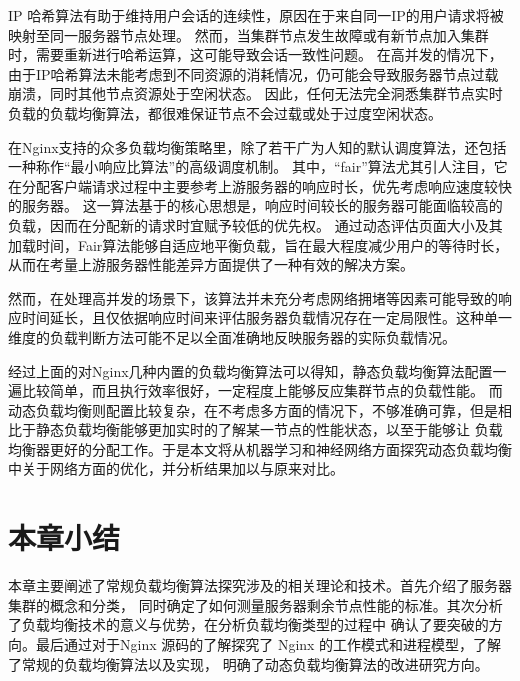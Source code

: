IP 哈希算法有助于维持用户会话的连续性，原因在于来自同一IP的用户请求将被映射至同一服务器节点处理。
然而，当集群节点发生故障或有新节点加入集群时，需要重新进行哈希运算，这可能导致会话一致性问题。
在高并发的情况下，由于IP哈希算法未能考虑到不同资源的消耗情况，仍可能会导致服务器节点过载崩溃，同时其他节点资源处于空闲状态。
因此，任何无法完全洞悉集群节点实时负载的负载均衡算法，都很难保证节点不会过载或处于过度空闲状态。

在Nginx支持的众多负载均衡策略里，除了若干广为人知的默认调度算法，还包括一种称作“最小响应比算法”的高级调度机制。
其中，“fair”算法尤其引人注目，它在分配客户端请求过程中主要参考上游服务器的响应时长，优先考虑响应速度较快的服务器。
这一算法基于的核心思想是，响应时间较长的服务器可能面临较高的负载，因而在分配新的请求时宜赋予较低的优先权。
通过动态评估页面大小及其加载时间，Fair算法能够自适应地平衡负载，旨在最大程度减少用户的等待时长，从而在考量上游服务器性能差异方面提供了一种有效的解决方案。

然而，在处理高并发的场景下，该算法并未充分考虑网络拥堵等因素可能导致的响应时间延长，且仅依据响应时间来评估服务器负载情况存在一定局限性。这种单一维度的负载判断方法可能不足以全面准确地反映服务器的实际负载情况\cite{张艳肖2023基于Fair函数神经网络的厚度传感器输出特性分析}。

经过上面的对Nginx几种内置的负载均衡算法可以得知，静态负载均衡算法配置一遍比较简单，而且执行效率很好，一定程度上能够反应集群节点的负载性能。
而动态负载均衡则配置比较复杂，在不考虑多方面的情况下，不够准确可靠，但是相比于静态负载均衡能够更加实时的了解某一节点的性能状态，以至于能够让
负载均衡器更好的分配工作。于是本文将从机器学习和神经网络方面探究动态负载均衡中关于网络方面的优化，并分析结果加以与原来对比。

\section{本章小结}

本章主要阐述了常规负载均衡算法探究涉及的相关理论和技术。首先介绍了服务器集群的概念和分类，
同时确定了如何测量服务器剩余节点性能的标准。其次分析了负载均衡技术的意义与优势，在分析负载均衡类型的过程中
确认了要突破的方向。最后通过对于Nginx 源码的了解探究了 Nginx 的工作模式和进程模型，了解了常规的负载均衡算法以及实现，
明确了动态负载均衡算法的改进研究方向。
